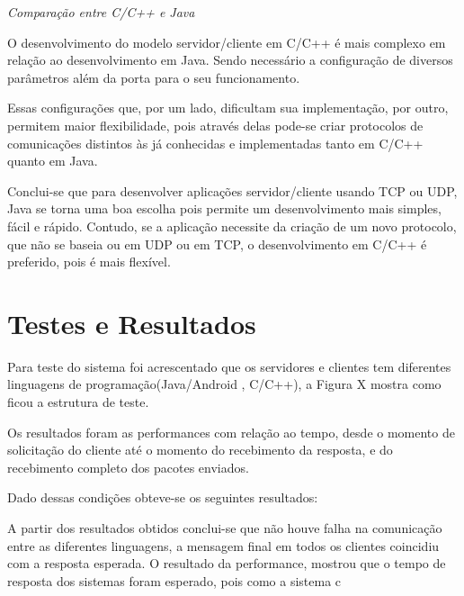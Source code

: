 \documentclass[12pt,a4paper]{article}
\begin{document}
\textit{\Large{Comparação entre C/C++ e Java}}

O desenvolvimento do modelo servidor/cliente em C/C++ é mais complexo em relação ao desenvolvimento em Java. Sendo necessário a configuração de diversos parâmetros além da porta para o seu funcionamento.

Essas configurações que, por um lado, dificultam sua implementação, por outro, permitem maior flexibilidade, pois através delas pode-se criar protocolos de comunicações distintos às já conhecidas e implementadas tanto em C/C++ quanto em Java.

Conclui-se que para desenvolver aplicações servidor/cliente usando TCP ou UDP, Java se torna uma boa escolha pois permite um desenvolvimento mais simples, fácil e rápido. Contudo, se a aplicação necessite da criação de um novo protocolo, que não se baseia ou em UDP ou em TCP, o desenvolvimento em C/C++ é preferido, pois é mais flexível.

\newpage
\section{Testes e Resultados}
Para teste do sistema foi acrescentado que os servidores e clientes tem diferentes linguagens de programação(Java/Android , C/C++), a Figura X mostra como ficou a estrutura de teste.

Os resultados foram as performances com relação ao tempo, desde o momento de solicitação do cliente até o momento do recebimento da resposta, e do recebimento completo dos pacotes enviados.

Dado dessas condições obteve-se os seguintes resultados:

A partir dos resultados obtidos conclui-se que não houve falha na comunicação entre as diferentes linguagens, a mensagem final em todos os clientes coincidiu com a resposta esperada.
O resultado da performance, mostrou que o tempo de resposta dos sistemas foram esperado, pois como a sistema c
\end{document}
